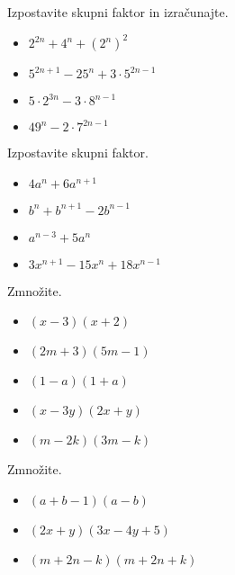             \begin{naloga}
                Izpostavite skupni faktor in izračunajte.
                \begin{itemize}
                    \item $2^{2n}+4^n+(2^n)^2$ 
                    \item $5^{2n+1}-25^n+3\cdot 5^{2n-1}$ 
                    \item $5\cdot 2^{3n}-3\cdot 8^{n-1}$ 
                    \item $49^n-2\cdot 7^{2n-1}$ 
                \end{itemize}
            \end{naloga}
        
    
        
            \begin{naloga}
                Izpostavite skupni faktor.
                \begin{itemize}
                    \item $4a^n+6a^{n+1}$ 
                    \item $b^n+b^{n+1}-2b^{n-1}$ 
                    \item $a^{n-3}+5a^n$ 
                    \item $3x^{n+1}-15x^n+18x^{n-1}$ 
                \end{itemize}
            \end{naloga}
        
    
        
            \begin{naloga}
                Zmnožite.
                \begin{itemize}
                    \item $(x-3)(x+2)$ 
                    \item $(2m+3)(5m-1)$ 
                    \item $(1-a)(1+a)$ 
                    \item $(x-3y)(2x+y)$ 
                    \item $(m-2k)(3m-k)$ 
                \end{itemize}
            \end{naloga}
        
    
        
            \begin{naloga}
                Zmnožite.
                \begin{itemize}
                    \item $(a+b-1)(a-b)$ 
                    \item $(2x+y)(3x-4y+5)$ 
                    \item $(m+2n-k)(m+2n+k)$ 
                \end{itemize}
            \end{naloga}
        
